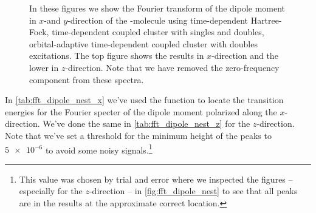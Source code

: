 \begin{figure}
            \caption{In these figures we show the Fourier transform of the
            dipole moment in $x$-and $y$-direction of the -molecule
            using time-dependent Hartree-Fock, time-dependent coupled cluster
            with singles and doubles, orbital-adaptive time-dependent coupled
            cluster with doubles excitations.
            The top figure shows the results in $x$-direction and the lower
            in $z$-direction.
            Note that we have removed the zero-frequency component from
            these spectra.}
            \label{fig:fft_dipole_nest}
        \end{figure}
        In \autoref{tab:fft_dipole_nest_x} we've used the function
         \cite{scipy} to locate the transition
        energies for the Fourier specter of the dipole moment polarized along
        the $x$-direction.
        We've done the same in \autoref{tab:fft_dipole_nest_z} for the
        $z$-direction.
        Note that we've set a threshold for the minimum height of the peaks to
        $\num{5e-6}$ to avoid some noisy signals.\footnote{%
            This value was chosen by trial and error where we inspected the
            figures --especially for the $z$-direction -- in
            \autoref{fig:fft_dipole_nest} to see that all peaks are in the
            results at the approximate correct location.
        }

